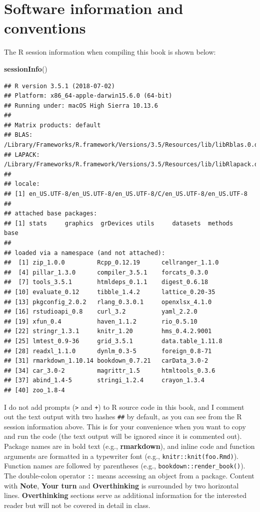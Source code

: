 \documentclass[]{book}
\newenvironment{Shaded}{\begin{snugshade}}{\end{snugshade}}
\newcommand{\KeywordTok}[1]{\textcolor[rgb]{0.13,0.29,0.53}{\textbf{#1}}}
\newcommand{\NormalTok}[1]{#1}
\begin{document}
\hypertarget{software-information-and-conventions}{%
\section*{Software information and
conventions}\label{software-information-and-conventions}}

The R session information when compiling this book is shown below:

\begin{Shaded}
\begin{Highlighting}[]
\KeywordTok{sessionInfo}\NormalTok{()}
\end{Highlighting}
\end{Shaded}

\begin{verbatim}
## R version 3.5.1 (2018-07-02)
## Platform: x86_64-apple-darwin15.6.0 (64-bit)
## Running under: macOS High Sierra 10.13.6
## 
## Matrix products: default
## BLAS: /Library/Frameworks/R.framework/Versions/3.5/Resources/lib/libRblas.0.dylib
## LAPACK: /Library/Frameworks/R.framework/Versions/3.5/Resources/lib/libRlapack.dylib
## 
## locale:
## [1] en_US.UTF-8/en_US.UTF-8/en_US.UTF-8/C/en_US.UTF-8/en_US.UTF-8
## 
## attached base packages:
## [1] stats     graphics  grDevices utils     datasets  methods   base     
## 
## loaded via a namespace (and not attached):
##  [1] zip_1.0.0         Rcpp_0.12.19      cellranger_1.1.0 
##  [4] pillar_1.3.0      compiler_3.5.1    forcats_0.3.0    
##  [7] tools_3.5.1       htmldeps_0.1.1    digest_0.6.18    
## [10] evaluate_0.12     tibble_1.4.2      lattice_0.20-35  
## [13] pkgconfig_2.0.2   rlang_0.3.0.1     openxlsx_4.1.0   
## [16] rstudioapi_0.8    curl_3.2          yaml_2.2.0       
## [19] xfun_0.4          haven_1.1.2       rio_0.5.10       
## [22] stringr_1.3.1     knitr_1.20        hms_0.4.2.9001   
## [25] lmtest_0.9-36     grid_3.5.1        data.table_1.11.8
## [28] readxl_1.1.0      dynlm_0.3-5       foreign_0.8-71   
## [31] rmarkdown_1.10.14 bookdown_0.7.21   carData_3.0-2    
## [34] car_3.0-2         magrittr_1.5      htmltools_0.3.6  
## [37] abind_1.4-5       stringi_1.2.4     crayon_1.3.4     
## [40] zoo_1.8-4
\end{verbatim}

I do not add prompts (\texttt{\textgreater{}} and \texttt{+}) to R
source code in this book, and I comment out the text output with two
hashes \texttt{\#\#} by default, as you can see from the R session
information above. This is for your convenience when you want to copy
and run the code (the text output will be ignored since it is commented
out). Package names are in bold text (e.g., \textbf{rmarkdown}), and
inline code and function arguments are formatted in a typewriter font
(e.g.,
\texttt{knitr::knit(\textquotesingle{}foo.Rmd\textquotesingle{})}).
Function names are followed by parentheses (e.g.,
\texttt{bookdown::render\_book()}). The double-colon operator
\texttt{::} means accessing an object from a package. Content with
\textbf{Note}, \textbf{Your turn} and \textbf{Overthinking} is
surrounded by two horizontal lines. \textbf{Overthinking} sections serve
as additional information for the interested reader but will not be
covered in detail in class.
\end{document}
